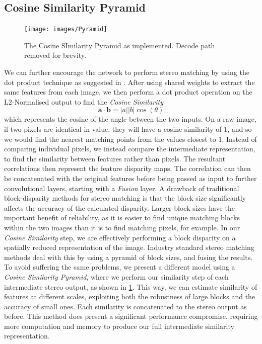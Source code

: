 \documentclass[ %
                    author={Gavin Parker},
                supervisor={Dr. Neill Campbell},
                    degree={MEng},
                     title={Deep Siamese Networks for Illumination Estimation from Stereo Images},
                  subtitle={},
                      type={Research},
                      year={2018} ]{dissertation}
\begin{document}
\subsection{Cosine Similarity Pyramid}
\begin{figure}[H]
\label{pyramid}
\centering
\texttt{[image: images/Pyramid]}
\caption{The Cosine SImilarity Pyramid as implemented. Decode path removed for brevity.}
\end{figure}
We can further encourage the network to perform stereo matching by using the dot product technique as suggested in \cite{7780983}. After using shared weights to extract the same features from each image, we then perform a dot product operation on the L2-Normalised output to find the \textit{Cosine Similarity}
\[\bm{a}\cdot \bm{b} = \lvert a \rvert \lvert b\rvert \cos(\theta) \]
which represents the cosine of the angle between the two inputs. On a raw image, if two pixels are identical in value, they will have a cosine similarity of 1, and so we would find the nearest matching points from the values closest to 1. Instead of comparing individual pixels, we instead compare the intermediate representation, to find the similarity between features rather than pixels. The resultant correlations then represent the feature disparity maps. The correlation can then be concatenated with the original features before being passed as input to further convolutional layers, starting with a \textit{Fusion} layer.
\newline
A drawback of traditional block-disparity methods for stereo matching is that the block size significantly affects the accuracy of the calculated disparity. Larger block sizes have the important benefit of reliability, as it is easier to find unique matching blocks within the two images than it is to find matching pixels, for example. In our \textit{Cosine Similarity} step, we are effectively performing a block disparity on a spatially reduced representation of the image. Industry standard stereo matching methods deal with this by using a pyramid of block sizes, and fusing the results. To avoid suffering the same problems, we present a different model using a \textit{Cosine Similarity Pyramid}, where we perform our similarity step of each intermediate stereo output, as shown in \ref{pyramid}. This way, we can estimate similarity of features at different scales, exploiting both the robustness of large blocks and the accuracy of small ones. Each similarity is concatenated to the stereo output as before. This method does present a significant performance compromise, requiring more computation and memory to produce our full intermediate similarity representation.
\end{document}
